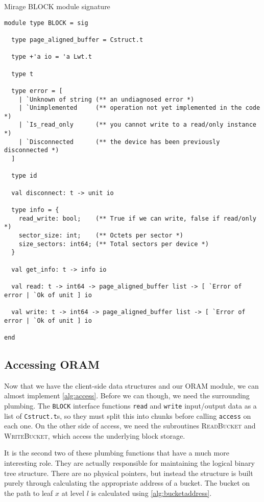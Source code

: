 \documentclass[12pt,a4paper,twoside,openright]{report}
\begin{document}
\begin{listing}
\caption{Mirage BLOCK module signature}
\label{lst:blocksig}
\vskip 10pt
\begin{verbatim}
module type BLOCK = sig

  type page_aligned_buffer = Cstruct.t

  type +'a io = 'a Lwt.t

  type t

  type error = [
    | `Unknown of string (** an undiagnosed error *)
    | `Unimplemented     (** operation not yet implemented in the code *)
    | `Is_read_only      (** you cannot write to a read/only instance *)
    | `Disconnected      (** the device has been previously disconnected *)
  ]

  type id

  val disconnect: t -> unit io

  type info = {
    read_write: bool;    (** True if we can write, false if read/only *)
    sector_size: int;    (** Octets per sector *)
    size_sectors: int64; (** Total sectors per device *)
  }

  val get_info: t -> info io

  val read: t -> int64 -> page_aligned_buffer list -> [ `Error of error | `Ok of unit ] io

  val write: t -> int64 -> page_aligned_buffer list -> [ `Error of error | `Ok of unit ] io

end
\end{verbatim}
\end{listing}

\subsection{Accessing ORAM}

Now that we have the client-side data structures and our ORAM module, we can almost implement \cref{alg:access}. Before we can though, we need the surrounding plumbing. The \texttt{BLOCK} interface functions \texttt{read} and \texttt{write} input/output data as a list of \texttt{Cstruct.t}s, so they must split this into chunks before calling \texttt{access} on each one. On the other side of access, we need the subroutines \textsc{ReadBucket} and \textsc{WriteBucket}, which access the underlying block storage.

It is the second two of these plumbing functions that have a much more interesting role. They are actually responsible for maintaining the logical binary tree structure. There are no physical pointers, but instead the structure is built purely through calculating the appropriate address of a bucket. The bucket on the path to leaf $x$ at level $l$ is calculated using \cref{alg:bucketaddress}.
\end{document}
